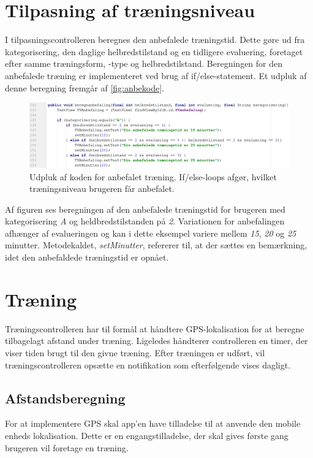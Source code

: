 \section{Tilpasning af træningsniveau}
I tilpasningscontrolleren beregnes den anbefalede træningstid. Dette gøre ud fra kategorisering, den daglige helbredstilstand og en tidligere evaluering, foretaget efter samme træningsform, -type og helbredstilstand.
Beregningen for den anbefalede træning er implementeret ved brug af if/else-statement. Et udpluk af denne beregning fremgår af \autoref{fig:anbekode}.  
   
\begin{figure} [H]
\centering
\includegraphics[width=1\textwidth]{figures/imple/anbekode}
\caption{Udpluk af koden for anbefalet træning. If/else-loops afgør, hvilket træningsniveau brugeren får anbefalet.}
\label{fig:anbekode}
\end{figure} 

\noindent
Af figuren ses beregningen af den anbefalede træningstid for brugeren med kategorisering \textit{A} og heldbredstilstanden på \textit{2}. Variationen for anbefalingen afhænger af evalueringen og kan i dette eksempel variere mellem \textit{15}, \textit{20} og \textit{25}  minutter. Metodekaldet, \textit{setMinutter}, refererer til, at der sættes en bemærkning, idet den anbefaldede træningstid er opnået.

\section{Træning}
Træningscontrolleren har til formål at håndtere GPS-lokalisation for at beregne tilbagelagt afstand under træning. Ligeledes håndterer controlleren en timer, der viser tiden brugt til den givne træning. Efter træningen er udført, vil træningscontrolleren opsætte en notifikation som efterfølgende vises dagligt. 


\subsection*{Afstandsberegning}
For at implementere GPS skal app'en have tilladelse til at anvende den mobile enheds lokalisation. Dette er en engangstilladelse, der skal gives første gang brugeren vil foretage en træning. 

